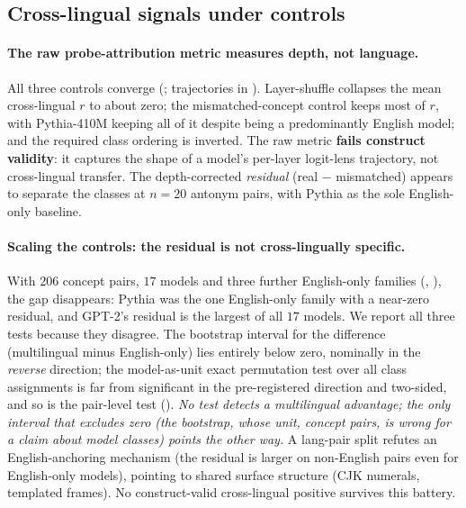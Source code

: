 \subsection{Cross-lingual signals under controls}\label{sec:results:secondary}\label{sec:results:construct-validity}\label{sec:results:probe-attribution}

\paragraph{The raw probe-attribution metric measures depth, not language.} All three controls converge (; trajectories in ).
Layer-shuffle collapses the mean cross-lingual $r$ to about zero; the
mismatched-concept control keeps most of $r$, with Pythia-410M keeping all of it despite
being a predominantly English model; and the required class ordering is inverted. The raw
metric \textbf{fails construct validity}: it captures the shape of a model's per-layer
logit-lens trajectory, not cross-lingual transfer. The depth-corrected \emph{residual}
(real $-$ mismatched) appears to separate the classes at $n=20$ antonym pairs, with Pythia as the
sole English-only baseline.

\paragraph{Scaling the controls: the residual is not cross-lingually specific.}\label{sec:results:residual-scaleup}
With $206$ concept pairs, $17$ models and three further English-only families
(, ), the gap disappears: Pythia was the
one English-only family with a near-zero residual, and GPT-2's residual is the largest of all
$17$ models. We report all three tests because they disagree. The bootstrap interval for the difference (multilingual minus English-only) lies entirely below
zero, nominally in the \emph{reverse} direction; the model-as-unit exact permutation test over all class
assignments is far from significant in the pre-registered direction and two-sided, and so is the
pair-level test (). \emph{No test detects a
multilingual advantage; the only interval that excludes zero (the bootstrap, whose unit, concept
pairs, is wrong for a claim about model classes) points the other way.} A lang-pair split refutes an
English-anchoring mechanism (the residual is larger on non-English pairs even for English-only
models), pointing to shared surface structure (CJK numerals, templated frames). No construct-valid
cross-lingual positive survives this battery.
